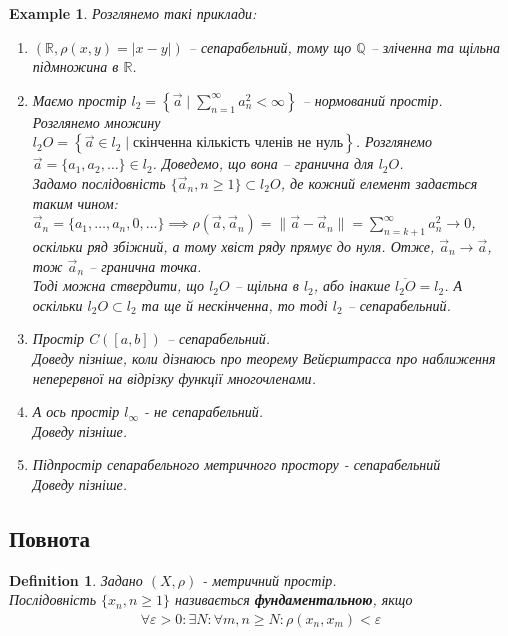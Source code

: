 \documentclass[a4paper, 10pt]{article}
\theoremstyle{theoremdd}
\theoremstyle{theoremdd}
\newtheorem{definition}[theorem]{Definition}
\theoremstyle{theoremdd}
\theoremstyle{theoremdd}
\newtheorem{example}[theorem]{Example}
\theoremstyle{theoremdd}
\theoremstyle{theoremdd}
\theoremstyle{theoremdd}
\theoremstyle{theoremdd}
\begin{document}
\begin{example} Розглянемо такі приклади:
\begin{enumerate}[wide=0pt,label={\arabic*)}]
\item $(\mathbb{R}, \rho(x,y) = |x-y|)$ -- сепарабельний, тому що $\mathbb{Q}$ -- зліченна та щільна підмножина в $\mathbb{R}$.
\item Маємо простір $l_2 = \left\{ \vec{a} \mid \displaystyle\sum_{n=1}^\infty a_n^2 < \infty \right\}$ -- нормований простір. Розглянемо множину \\
$l_2O = \left\{ \vec{a} \in l_2 \mid \text{скінченна кількість членів не нуль} \right\}$. Розглянемо $\vec{a} = \{a_1,a_2,\dots\} \in l_2$. Доведемо, що вона -- гранична для $l_2O$.\\
Задамо послідовність $\{\vec{a}_n, n \geq 1\} \subset l_2O$, де кожний елемент задається таким чином: \\ $\vec{a}_n = \{a_1,\dots,a_n,0,\dots\} \implies \rho(\vec{a}, \vec{a}_n) = \|\vec{a} - \vec{a}_n\| = \displaystyle\sum_{n=k+1}^\infty a_n^2 \to 0$, оскільки ряд збіжний, а тому хвіст ряду прямує до нуля. Отже, $\vec{a}_n \to \vec{a}$, тож $\vec{a}_n$ -- гранична точка.\\
Тоді можна ствердити, що $l_2O$ -- щільна в $l_2$, або інакше $\overline{l_2O} = l_2$. А оскільки $l_2O \subset l_2$ та ще й нескінченна, то тоді $l_2$ -- сепарабельний.
\item Простір $C([a,b])$ -- сепарабельний.\\
\textit{Доведу пізніше, коли дізнаюсь про теорему Вейєрштрасса про наближення неперервної на відрізку функції многочленами}.
\item А ось простір $l_{\infty}$ - не сепарабельний.\\
\textit{Доведу пізніше}.
\item Підпростір сепарабельного метричного простору - сепарабельний\\
\textit{Доведу пізніше}.
\end{enumerate}
\end{example}

\subsection{Повнота}
\begin{definition}
Задано $(X,\rho)$ - метричний простір.\\
Послідовність $\{x_n, n \geq 1\}$ називається \textbf{фундаментальною}, якщо
\begin{align*}
\forall \varepsilon > 0: \exists N: \forall m,n \geq N: \rho(x_n,x_m) < \varepsilon
\end{align*}
\end{definition}
\end{document}
